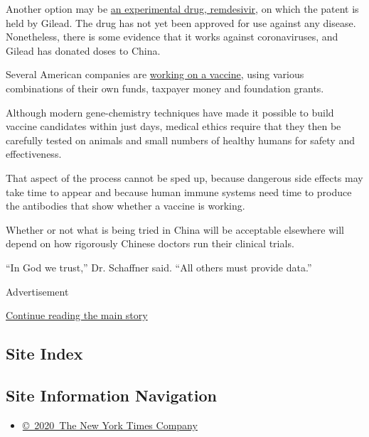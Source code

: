 Another option may be
\href{https://www.gilead.com/news-and-press/company-statements/gilead-sciences-statement-on-the-company-ongoing-response-to-the-2019-new-coronavirus}{an
experimental drug, remdesivir}, on which the patent is held by Gilead.
The drug has not yet been approved for use against any disease.
Nonetheless, there is some evidence that it works against coronaviruses,
and Gilead has donated doses to China.

Several American companies are
\href{https://www.nytimes.com/2020/01/28/health/coronavirus-vaccine.html}{working
on a vaccine}, using various combinations of their own funds, taxpayer
money and foundation grants.

Although modern gene-chemistry techniques have made it possible to build
vaccine candidates within just days, medical ethics require that they
then be carefully tested on animals and small numbers of healthy humans
for safety and effectiveness.

That aspect of the process cannot be sped up, because dangerous side
effects may take time to appear and because human immune systems need
time to produce the antibodies that show whether a vaccine is working.

Whether or not what is being tried in China will be acceptable elsewhere
will depend on how rigorously Chinese doctors run their clinical trials.

``In God we trust,'' Dr. Schaffner said. ``All others must provide
data.''

Advertisement

\protect\hyperlink{after-bottom}{Continue reading the main story}

\hypertarget{site-index}{%
\subsection{Site Index}\label{site-index}}

\hypertarget{site-information-navigation}{%
\subsection{Site Information
Navigation}\label{site-information-navigation}}

\begin{itemize}
\tightlist
\item
  \href{https://help.nytimes.com/hc/en-us/articles/115014792127-Copyright-notice}{©~2020~The
  New York Times Company}
\end{itemize}

